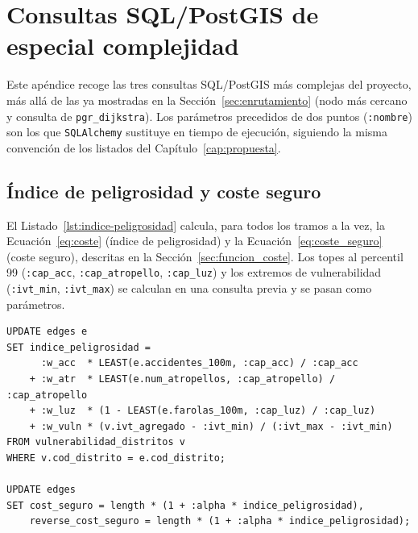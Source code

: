 \chapter{Consultas SQL/PostGIS de especial complejidad}
\label{ap:sql}

Este apéndice recoge las tres consultas SQL/PostGIS más complejas del proyecto, más allá de las ya mostradas en la Sección~\ref{sec:enrutamiento} (nodo más cercano y consulta de \texttt{pgr\_dijkstra}). Los parámetros precedidos de dos puntos (\texttt{:nombre}) son los que \texttt{SQLAlchemy} sustituye en tiempo de ejecución, siguiendo la misma convención de los listados del Capítulo~\ref{cap:propuesta}.

\section{Índice de peligrosidad y coste seguro}
\label{ap:sec:indice_peligrosidad}

El Listado~\ref{lst:indice-peligrosidad} calcula, para todos los tramos a la vez, la Ecuación~\ref{eq:coste} (índice de peligrosidad) y la Ecuación~\ref{eq:coste_seguro} (coste seguro), descritas en la Sección~\ref{sec:funcion_coste}. Los topes al percentil 99 (\texttt{:cap\_acc}, \texttt{:cap\_atropello}, \texttt{:cap\_luz}) y los extremos de vulnerabilidad (\texttt{:ivt\_min}, \texttt{:ivt\_max}) se calculan en una consulta previa y se pasan como parámetros.

\begin{lstlisting}[style=SQL, caption={Cálculo del índice de peligrosidad y del coste seguro (\texttt{scripts/07\_calcular\_indice\_seguridad.py}).}, label={lst:indice-peligrosidad}]
UPDATE edges e
SET indice_peligrosidad =
      :w_acc  * LEAST(e.accidentes_100m, :cap_acc) / :cap_acc
    + :w_atr  * LEAST(e.num_atropellos, :cap_atropello) / :cap_atropello
    + :w_luz  * (1 - LEAST(e.farolas_100m, :cap_luz) / :cap_luz)
    + :w_vuln * (v.ivt_agregado - :ivt_min) / (:ivt_max - :ivt_min)
FROM vulnerabilidad_distritos v
WHERE v.cod_distrito = e.cod_distrito;

UPDATE edges
SET cost_seguro = length * (1 + :alpha * indice_peligrosidad),
    reverse_cost_seguro = length * (1 + :alpha * indice_peligrosidad);
\end{lstlisting}

